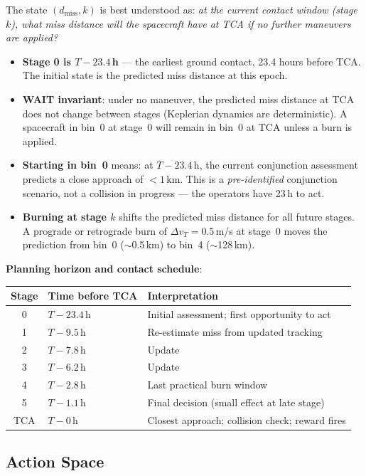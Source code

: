 \documentclass[11pt]{article}
\begin{document}
The state $(d_\text{miss}, k)$ is best understood as: \emph{at the current contact window
(stage $k$), what miss distance will the spacecraft have at TCA if no further maneuvers
are applied?}

\begin{itemize}
  \item \textbf{Stage 0 is $T{-}23.4$\,h} --- the earliest ground contact, 23.4 hours
        before TCA. The initial state is the predicted miss distance at this epoch.
  \item \textbf{WAIT invariant}: under no maneuver, the predicted miss distance at TCA
        does not change between stages (Keplerian dynamics are deterministic). A spacecraft
        in bin~0 at stage~0 will remain in bin~0 at TCA unless a burn is applied.
  \item \textbf{Starting in bin~0} means: at $T{-}23.4$\,h, the current conjunction
        assessment predicts a close approach of $< 1$\,km. This is a \emph{pre-identified}
        conjunction scenario, not a collision in progress --- the operators have 23\,h to act.
  \item \textbf{Burning at stage $k$} shifts the predicted miss distance for all future
        stages. A prograde or retrograde burn of $\Delta v_T = 0.5$\,m/s at stage~0
        moves the prediction from bin~0 ($\sim$0.5\,km) to bin~4 ($\sim$128\,km).
\end{itemize}

\noindent\textbf{Planning horizon and contact schedule}:
\begin{center}
\begin{tabular}{cll}
\toprule
Stage & Time before TCA & Interpretation \\
\midrule
0 & $T{-}23.4$\,h & Initial assessment; first opportunity to act \\
1 & $T{-}9.5$\,h  & Re-estimate miss from updated tracking \\
2 & $T{-}7.8$\,h  & Update \\
3 & $T{-}6.2$\,h  & Update \\
4 & $T{-}2.8$\,h  & Last practical burn window \\
5 & $T{-}1.1$\,h  & Final decision (small effect at late stage) \\
TCA & $T{-}0$\,h  & Closest approach; collision check; reward fires \\
\bottomrule
\end{tabular}
\end{center}

\subsection{Action Space}
\end{document}
